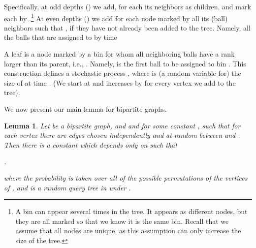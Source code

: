 \documentclass[english, oribibl]{llncs}
\newtheorem{lemma}[theorem]{Lemma}
\begin{document}
Specifically, at odd depths () we add, for each  its  neighbors  as children, and mark each by .\footnote{A bin can appear several times in the tree. 
It appears as different nodes, but they are all marked so that we know it is the same bin. Recall that we assume that all nodes are unique, as this assumption can only increase the size of the tree.}
At even depths () we add for each node marked by  all its (ball) neighbors  such that , if they have not already been added to the tree. Namely, all the balls that are assigned to  by time


A leaf is a node marked by a bin  for whom all neighboring balls  have a rank larger than its parent, i.e., . Namely,  is the first ball to be assigned to bin .
This construction defines a stochastic process ,
where  is (a random variable for) the size of  at time . (We start at  and  increases by  for every vertex we add to the tree).

We now present our main lemma for bipartite graphs.
\begin{lemma}
\label{lemma:bipartite}
Let  be a bipartite graph,  and  and  for some constant , such that for each
vertex  there are  edges chosen independently and at random between  and . Then there is a constant
 which depends only on  such that 
\begin{center}
,
\end{center}
where the probability is taken over all of the possible permutations  of the vertices of , and  is a random query tree in  under .
\end{lemma}


























\begin{comment}
We define the following local version of this problem:
Given  balls, 
(each with a rank chosen uniformly at random from ) and   bins, and  choices for each ball,
for each query , find a consistent allocation for  such that the maximum load on the bins is minimized.
Recall that by \emph{consistent} we mean that for each query the output is consistent with some global
allocation , in which the maximum load is minimized.
We refer to this problem as \emph{Local Balls and Bins} problem.
\end{comment}
\end{document}
